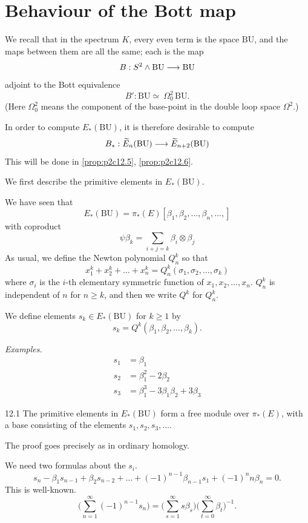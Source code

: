 \documentclass[../main]{subfiles}
\begin{document}

\chapter{Behaviour of the Bott map}
\label{sec:p2c12}
We recall that in the spectrum $K$, every even term is the space $\mathrm{BU}$, and the maps between them are all the same; each is the map \[B:S^2\wedge \mathrm{BU} \longrightarrow  \mathrm{BU}\] adjoint to the Bott equivalence \[B':\mathrm{BU}\simeq\:\Omega^2_0\,\mathrm{BU}.\]%
(Here $\Omega^2_0$ means the component of the base-point in the double loop space $\Omega^2$.)

In order to compute $E_\ast(\mathrm{BU})$, it is therefore desirable to compute \[B_\ast:\widetilde{E}_n(\mathrm{BU}) \longrightarrow \widetilde{E}_{n+2}( \mathrm{BU})\]
This will be done in \eqref{prop:p2c12.5}, \eqref{prop:p2c12.6}.

We first describe the primitive elements in $E_\ast(\mathrm{BU})$.

We have seen that \[E_\ast(\mathrm{BU}) = \pi_\ast(E)[\beta_1, \beta_2, \dots, \beta_n, \dots,]\] with coproduct
\[\psi\beta_k = \sum_{i+j=k}\beta_i\otimes\beta_j\]
As usual, we define the Newton polynomial $Q_n^k$ so that \[x_1^k + x_2^k + \dots + x_n^k = Q^k_n(\sigma_1, \sigma_2, \dots, \sigma_k)\] where $\sigma_i$ is the $i$-th elementary symmetric function of $x_1, x_2, \dots, x_n$. $Q_n^k$ is independent of $n$ for $n\ge k$, and then we write $Q^k$ for $Q_n^k$.

We define elements $s_k \in E_\ast(\mathrm{BU})$ for $k\ge 1$ by \[s_k = Q^k(\beta_1, \beta_2, \dots, \beta_k).\]

\emph{Examples.}
\begin{align*}
s_1 &= \beta_1\\
s_2 &= \beta_1^2 - 2\beta_2\\
s_3 &= \beta_1^3 - 3\beta_1\beta_2 + 3\beta_3
\end{align*}

\begin{customprop}{12.1}
\label{prop:p2c12.1}
The primitive elements in $E_\ast( \mathrm{BU})$ form a free module over $\pi_\ast(E)$, with a base consisting of the elements $s_1, s_2, s_3, \dots$.

The proof goes precisely as in ordinary homology. 

We need two formulas about the $s_i$.
\begin{equation}
\label{eqn:p2c12.2}
\tag{12.2}
s_n - \beta_1 s_{n-1} + \beta_2 s_{n-2} + \dots + (-1)^{n-1}\beta_{n-1} s_1 + (-1)^n n\beta_n = 0.
\end{equation}
This is well-known.
\begin{equation}
\label{eqn:p2c12.3}
\tag{12.3}
\bigg(\sum^\infty_{n=1} (-1)^{n-1}s_n\bigg) = \bigg(\sum^\infty_{s=1}s\beta_s\bigg)\bigg(\sum^\infty_{t=0}\beta_t\bigg)^{-1}.
\end{equation}
\end{customprop}
\end{document}
